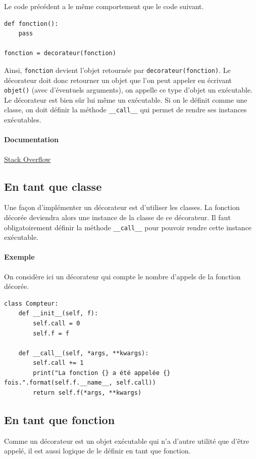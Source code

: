 \documentclass[a4paper, 10pt]{article}
\newcommand{\code}[1]{{\small\texttt{#1}}}
\begin{document}
Le code précédent a le même comportement que le code suivant.

\begin{verbatim}
def fonction():
    pass

fonction = decorateur(fonction)
\end{verbatim}

Ainsi, \code{fonction} devient l'objet retournée par \code{decorateur(fonction)}. Le décorateur doit donc retourner un objet que l'on peut appeler en écrivant \code{objet()} (avec d'éventuels arguments), on appelle ce type d'objet un \og exécutable\fg{}. Le décorateur est bien sûr lui même un exécutable. Si on le définit comme une classe, on doit définir la méthode \code{\_\_call\_\_} qui permet de rendre ses instances exécutables.

\paragraph{Documentation} \href{https://stackoverflow.com/questions/739654/how-to-make-a-chain-of-function-decorators/1594484#1594484}{Stack Overflow}

\subsection{En tant que classe}
Une façon d'implémenter un décorateur est d'utiliser les classes. La fonction décorée deviendra alors une instance de la classe de ce décorateur. Il faut obligatoirement définir la méthode \code{\_\_call\_\_} pour pouvoir rendre cette instance exécutable.

\paragraph{Exemple} On considère ici un décorateur qui compte le nombre d'appels de la fonction décorée.
\begin{verbatim}
class Compteur:
    def __init__(self, f):
        self.call = 0
        self.f = f

    def __call__(self, *args, **kwargs):
        self.call += 1
        print("La fonction {} a été appelée {} fois.".format(self.f.__name__, self.call))
        return self.f(*args, **kwargs)
\end{verbatim}
\subsection{En tant que fonction}
Comme un décorateur est un objet exécutable qui n'a d'autre utilité que d'être appelé, il est aussi logique de le définir en tant que fonction.
\end{document}
